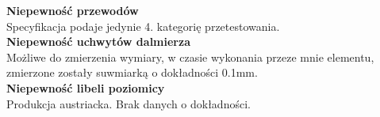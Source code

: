 \textbf{Niepewność przewodów}\\
Specyfikacja podaje jedynie 4. kategorię przetestowania.\\

\textbf{Niepewność uchwytów dalmierza}\\
Możliwe do zmierzenia wymiary, w czasie wykonania przeze mnie elementu, zmierzone zostały suwmiarką o dokładności 0.1mm.\\

\textbf{Niepewność libeli poziomicy}\\
Produkcja austriacka. Brak danych o dokładności.\\